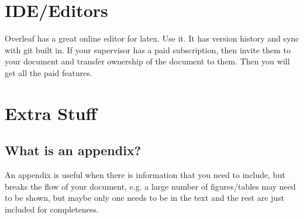 \documentclass[a4paper,twoside,12pt]{report}
\begin{document}
\chapter{IDE/Editors}
Overleaf has a great online editor for latex. Use it. It has version history and sync with git built in. If your supervisor has a paid subscription, then invite them to your document and transfer ownership of the document to them. Then you will get all the paid features.

\clearpage   %
{}


\appendix
\chapter{Extra Stuff}\label{app:extra}
\section{What is an appendix?}\label{app:whatis}

An appendix is useful when there is information that you need to include, but breaks the flow of your document, e.g. a large number of figures/tables may need to be shown, but maybe only one needs to be in the text and the rest are just included for completeness.
\end{document}
